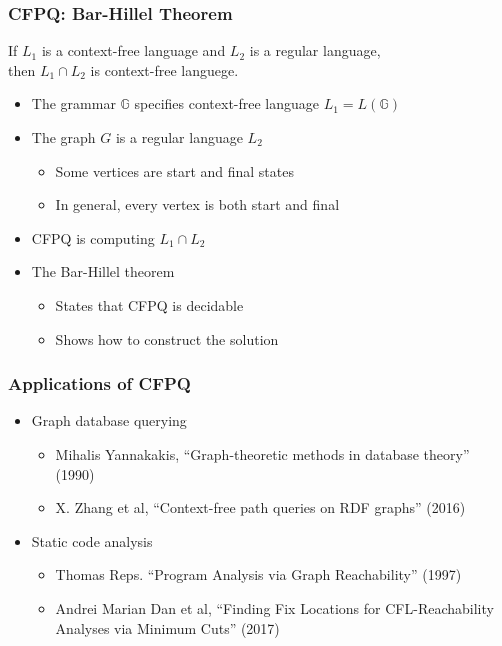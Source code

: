 \documentclass[xcolor=table]{beamer}
\begin{document}
\begin{frame} \frametitle{CFPQ: Bar-Hillel Theorem}

\begin{theorem}
	If $L_1$ is a context-free language and $L_2$ is a regular language, \\ then $L_1 \cap L_2$ is context-free languege.
\end{theorem}

  \begin{itemize}
    \item The grammar $\mathbb{G}$ specifies context-free language $L_1 = L(\mathbb{G})$
    \pause
    \item The graph $G$ is a regular language $L_2$
    \begin{itemize}
      \item Some vertices are start and final states
      \pause
      \item In general, every vertex is both start and final
    \end{itemize}
    \pause
    \item CFPQ is computing $L_1 \cap L_2$
    \pause
    \item The Bar-Hillel theorem
      \begin{itemize}
        \item States that CFPQ is decidable
        \item Shows how to construct the solution
      \end{itemize}

  \end{itemize}
\end{frame}

\begin{frame} \frametitle{Applications of CFPQ}
\begin{itemize}
	\item Graph database querying
  \begin{itemize}
  	\item Mihalis Yannakakis, ``Graph-theoretic methods in database theory'' (1990)
    \item X. Zhang et al, ``Context-free path queries on RDF graphs'' (2016)
  \end{itemize}
  \pause
  \item Static code analysis
  \begin{itemize}
  	\item Thomas Reps. ``Program Analysis via Graph Reachability'' (1997)
    \item Andrei Marian Dan et al, ``Finding Fix Locations for CFL-Reachability Analyses via Minimum Cuts'' (2017)
  \end{itemize}
\end{itemize}
\end{frame}
\end{document}
